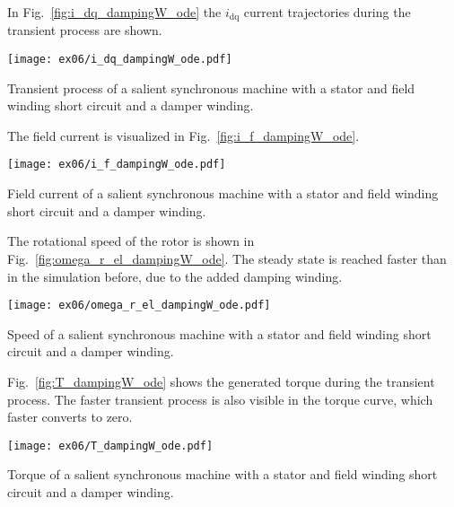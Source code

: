\begin{solutionblock}
    In Fig.~\ref{fig:i_dq_dampingW_ode} the $i_{\mathrm{dq}}$ current trajectories during the transient process are shown.
    \begin{solutionfigure}
        \centering
        \texttt{[image: ex06/i\_dq\_dampingW\_ode.pdf]}
        \caption{Transient process of a salient synchronous machine with a stator and field winding short circuit and a damper winding.}
        \label{fig:i_dq_dampingW_ode}
    \end{solutionfigure}

    The field current is visualized in Fig.~\ref{fig:i_f_dampingW_ode}.
    \begin{solutionfigure}
        \centering
        \texttt{[image: ex06/i\_f\_dampingW\_ode.pdf]}
        \caption{Field current of a salient synchronous machine with a stator and field winding short circuit and a damper winding.}
        \label{fig:i_f_dampingW_ode}
    \end{solutionfigure}

    The rotational speed of the rotor is shown in Fig.~\ref{fig:omega_r_el_dampingW_ode}. The steady state is reached faster than in the simulation before, due to the added damping winding.
    \begin{solutionfigure}
        \centering
        \texttt{[image: ex06/omega\_r\_el\_dampingW\_ode.pdf]}
        \caption{Speed of a salient synchronous machine with a stator and field winding short circuit and a damper winding.}
        \label{fig:omega_r_el_dampingW_ode}
    \end{solutionfigure}

    Fig.~\ref{fig:T_dampingW_ode} shows the generated torque during the transient process. The faster transient process is also visible in the torque curve, which faster converts to zero.
    \begin{solutionfigure}
        \centering
        \texttt{[image: ex06/T\_dampingW\_ode.pdf]}
        \caption{Torque of a salient synchronous machine with a stator and field winding short circuit and a damper winding.}
        \label{fig:T_dampingW_ode}
    \end{solutionfigure}

\end{solutionblock}
\FloatBarrier


